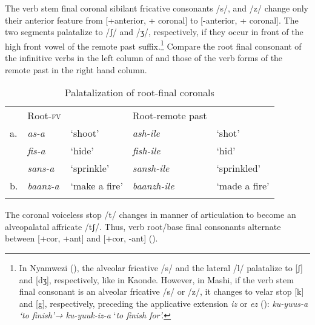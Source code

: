 \documentclass[output=paper]{langsci/langscibook}
\begin{document}
The verb stem final coronal sibilant fricative consonants /s/, and /z/ change only their anterior feature from [+anterior, + coronal] to [-anterior, + coronal]. The two segments palatalize to /ʃ/ and /ʒ/, respectively, if they occur in front of the high front vowel of the remote past suffix.\footnote{In Nyamwezi (\citealt{magangaschadeberg1992}), the alveolar fricative /s/ and the lateral /l/ palatalize to [ʃ] and [dʒ], respectively, like in Kaonde. However, in Mashi, if the verb stem final consonant is an alveolar fricative /s/ or /z/, it changes to velar stop [k] and [g], respectively, preceding the applicative extension \textit{iz} or \textit{ez} (\citealt{bashi2008}): \textit{ku-yuus-a }\textit{\textup{‘to finish’}}\textit{\textup{→}} \textit{ku-yuuk-iz-a} ‘\textit{\textup{to finish for’.}}} Compare the root final consonant of the infinitive verbs in the left column of  and those of the verb forms of the remote past in the right hand column.

\begin{table}
\begin{tabular}{lllll}
\lsptoprule
 & Root-\textsc{fv} &  & Root-remote past & \\
a. & \textit{as-a} & `shoot' & \textit{ash-ile} & `shot' \\
 & \textit{fis-a} & `hide' & \textit{fish-ile} & `hid' \\
 & \textit{sans-a} & `sprinkle' & \textit{sansh-ile} & `sprinkled' \\
b. & \textit{baanz-a} & `make a fire' & \textit{baanzh-ile} & `made a fire' \\

\lspbottomrule
\end{tabular}

\caption{Palatalization of root-final coronals}
\label{tab:9.kawasha}

 \end{table}


The coronal voiceless stop /t/ changes in manner of articulation to become an alveopalatal affricate /tʃ/. Thus, verb root/base final consonants alternate between [+cor, +ant] and [+cor, -ant] ().
\end{document}

